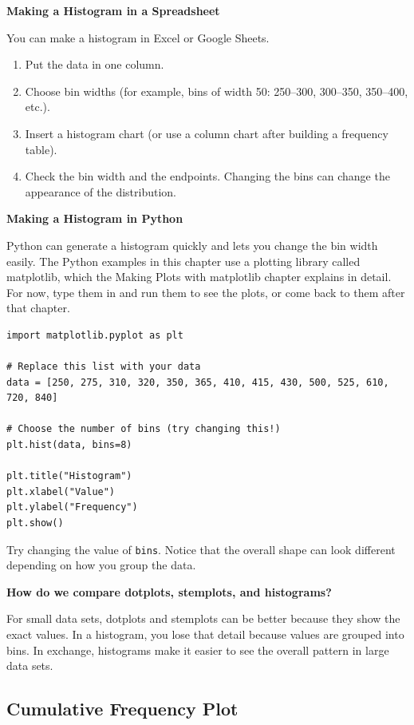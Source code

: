 \textbf{Making a Histogram in a Spreadsheet}

You can make a histogram in Excel or Google Sheets.

\begin{enumerate}
    \item Put the data in one column.
    \item Choose bin widths (for example, bins of width 50: 250--300, 300--350, 350--400, etc.).
    \item Insert a histogram chart (or use a column chart after building a frequency table).
    \item Check the bin width and the endpoints. Changing the bins can change the appearance of the distribution.
\end{enumerate}

\textbf{Making a Histogram in Python}

Python can generate a histogram quickly and lets you change the bin width easily. The Python examples in
this chapter use a plotting library called matplotlib, which the Making Plots with matplotlib chapter explains
in detail. For now, type them in and run them to see the plots, or come back to them after that chapter.

\begin{verbatim}
import matplotlib.pyplot as plt

# Replace this list with your data
data = [250, 275, 310, 320, 350, 365, 410, 415, 430, 500, 525, 610, 720, 840]

# Choose the number of bins (try changing this!)
plt.hist(data, bins=8)

plt.title("Histogram")
plt.xlabel("Value")
plt.ylabel("Frequency")
plt.show()
\end{verbatim}

Try changing the value of \texttt{bins}. Notice that the overall shape can look different depending on how you group the data.

\textbf{How do we compare dotplots, stemplots, and histograms?}

For small data sets, dotplots and stemplots can be better because they show the exact values.
In a histogram, you lose that detail because values are grouped into bins. In exchange, histograms make it easier
to see the overall pattern in large data sets.

\subsection{Cumulative Frequency Plot}


